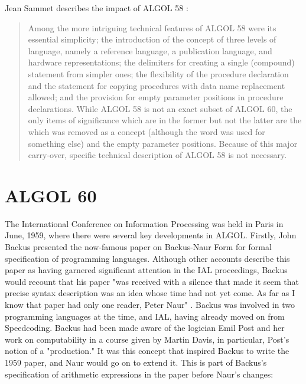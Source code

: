 Jean Sammet describes the impact of ALGOL 58
\cite{sammet_programming_languages_history_and_fundamentals_1969}:
\begin{quotation}
Among the more intriguing technical features of ALGOL 58 were its essential 
simplicity; the introduction of the concept of three levels of language, namely 
a reference language, a publication language, and hardware representations; the 
 delimiters for creating a single (compound) statement from simpler 
ones; the flexibility of the procedure declaration and the  statement for 
copying procedures with data name replacement allowed; and the provision for 
empty parameter positions in procedure declarations. While ALGOL 58 is not an 
exact subset of ALGOL 60, the only items of significance which are in the 
former but not the latter are the  which was removed as a concept (although 
the word was used for something else) and the empty parameter positions. 
Because of this major carry-over, specific technical description of ALGOL 58 is 
not necessary. 
\end{quotation}

\section{ALGOL 60}


The International Conference on Information Processing was held in Paris
in June, 1959, where there were several key developments in ALGOL.
Firstly, John Backus presented the now-famous paper on Backus-Naur Form
for formal specification of programming languages\cite{backus_ial_1959}.
Although other accounts describe this paper as having garnered significant
attention in the IAL proceedings, Backus would recount that his paper
"was received with a silence that made it seem that precise syntax
description was an idea whose time had not yet come.
As far as I know that paper had only one reader, Peter Naur"
\cite{Backus_1980_Programming_in_America_in_1950s}.
Backus was involved in two programming languages at the time, \FTN{} and IAL,
having already moved on from Speedcoding.
Backus had been made aware of the logician Emil Post and her work on computability
in a course given by Martin Davis, in particular, Post's notion of a "production."
It was this concept that inspired Backus to write the 1959 paper, and Naur
would go on to extend it. This is part of Backus's specification of arithmetic expressions
in the paper before Naur's changes\cite{backus_ial_1959}:

